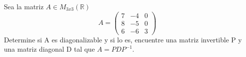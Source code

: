 \documentclass[letter]{memoir} %
\newenvironment{cframed}[1][blue]
  {\begin{tcolorbox}[colframe=#1,colback=white]}
  {\end{tcolorbox}}
\begin{document}
\begin{enumerate}
\begin{enumerate}
\end{enumerate}


\begin{cframed}[teal]
\item Sea la matriz $A \in M_{3x3}(\mathbb{R})$
\[ A = \begin{pmatrix}
	7&-4&0\\
	8&-5&0\\
	6&-6&3
	\end{pmatrix}\]
Determine si A es diagonalizable y si lo es, encuentre una matriz invertible P y una matriz diagonal D tal que $A = PDP^{-1}$.
\end{cframed}

\end{enumerate}
\end{document}
